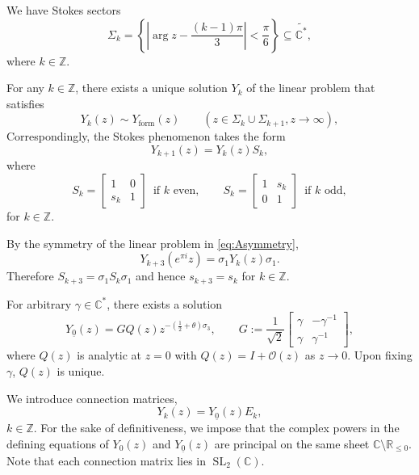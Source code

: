 \documentclass[a4paper,reqno]{amsart}
\numberwithin{equation}{section}
\numberwithin{equation}{section}
\begin{document}
We have Stokes sectors
\begin{equation*}
    \Sigma_k=\left\{\left|\arg z- \frac{(k-1)\pi}{3}\right|<\frac{\pi}{6}\right\}\subseteq \widetilde{\mathbb{C}^*},
\end{equation*}
where $k\in\mathbb{Z}$.

For any $k\in\mathbb{Z}$, there exists a unique solution $Y_k$ of the linear problem that satisfies
\begin{equation*}
    Y_k(z)\sim Y_\text{form}(z)\qquad (z\in \Sigma_k\cup \Sigma_{k+1}, z\rightarrow \infty),
\end{equation*}
Correspondingly, the Stokes phenomenon takes the form
\begin{equation*}
    Y_{k+1}(z)=Y_k(z)S_k,
\end{equation*}
where
\begin{equation*}
    S_k=\begin{bmatrix}
        1 & 0\\
        s_k & 1
    \end{bmatrix}\,\,\, \text{if $k$ even},\qquad
    S_k=\begin{bmatrix}
        1 & s_k\\
        0 & 1
    \end{bmatrix}\,\,\, \text{if $k$ odd},
\end{equation*}
for $k\in\mathbb{Z}$.

By the symmetry of the linear problem in \eqref{eq:Asymmetry},
\begin{equation*}
    Y_{k+3}(e^{\pi i}z)=\sigma_1Y_k(z)\sigma_1.
\end{equation*}
Therefore $S_{k+3}=\sigma_1S_k\sigma_1$ and hence $s_{k+3}=s_k$
for $k\in\mathbb{Z}$.

For arbitrary $\gamma\in\mathbb{C}^*$, there exists a solution
\begin{equation}\label{eq:FNY0sol}
    Y_{\underline{0}}(z)=G Q(z)z^{-(\frac{1}{2}+\theta)\sigma_3},\qquad G:=\frac{1}{\sqrt{2}}\begin{bmatrix}
        \gamma & -\gamma^{-1}\\
        \gamma & \gamma^{-1}
    \end{bmatrix},
\end{equation}
where $Q(z)$ is analytic at $z=0$ with $Q(z)=I+\mathcal{O}(z)$ as $z\rightarrow 0$. Upon fixing $\gamma$, $Q(z)$ is unique.


We introduce connection matrices,
\begin{equation*}
    Y_k(z)=Y_{\underline{0}}(z)E_k,
\end{equation*}
$k\in\mathbb{Z}$. For the sake of definitiveness, we impose that the complex powers in the defining equations of $Y_0(z)$ and $Y_{\underline{0}}(z)$ are principal on the same sheet $\mathbb{C}\setminus\mathbb{R}_{\leq 0}$. Note that each connection matrix lies in $\operatorname{SL}_2(\mathbb{C})$.
\end{document}
